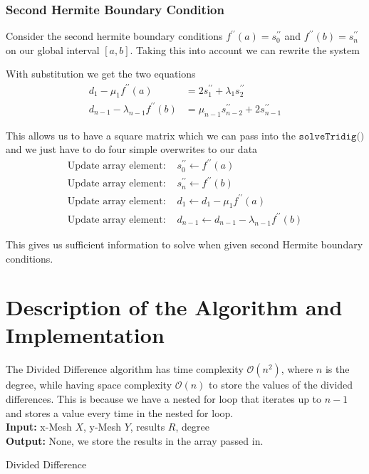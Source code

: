 \documentclass[12pt]{article}
\theoremstyle{remark}
\begin{document}
\subsubsection{Second Hermite Boundary Condition}

Consider the second hermite boundary conditions $f^{\prime\prime}(a) = s^{\prime\prime}_0$ and $f^{\prime\prime}(b) = s^{\prime\prime}_n$ on our global interval $[a,b]$. Taking this into account we can rewrite the system 

With substitution we get the two equations
\begin{align*}
d_1 - \mu_1f^{\prime\prime}(a) & = 2s^{\prime\prime}_1 + \lambda_1s^{\prime\prime}_2 \\
d_{n-1} - \lambda_{n-1}f^{\prime\prime}(b) & = \mu_{n-1}s^{\prime\prime}_{n-2} + 2s^{\prime\prime}_{n-1}
\end{align*}

This allows us to have a square matrix which we can pass into the $\texttt{solveTridig()}$ and we just have to do four simple overwrites to our data
\begin{align*}
\text{Update array element: } & s^{\prime\prime}_0 \leftarrow f^{\prime\prime}(a) \\
\text{Update array element: } & s^{\prime\prime}_{n} \leftarrow f^{\prime\prime}(b) \\
\text{Update array element: } & d_1 \leftarrow d_1 - \mu_1f^{\prime\prime}(a) \\
\text{Update array element: } & d_{n-1} \leftarrow d_{n-1} - \lambda_{n-1}f^{\prime\prime}(b)
\end{align*}

This gives us sufficient information to solve when given second Hermite boundary conditions. \\

\section{Description of the Algorithm and Implementation}

The Divided Difference algorithm has time complexity $\mathcal{O}(n^2)$, where $n$ is the degree, while having space complexity $\mathcal{O}(n)$ to store the values of the divided differences. This is because we have a nested for loop that iterates up to $n-1$ and stores a value every time in the nested for loop.
\\

\textbf{Input:} x-Mesh $X$, y-Mesh $Y$, results $R$, degree \\
\textbf{Output:} None, we store the results in the array passed in.
\begin{algorithm}[H]
	\caption{Divided Difference}
	\begin{algorithmic}[1]	
		\State{$R_i] \leftarrow Y_i$}
		\EndFor
		\EndFor
		\EndFor	 
	\end{algorithmic}
\end{algorithm}
\end{document}
